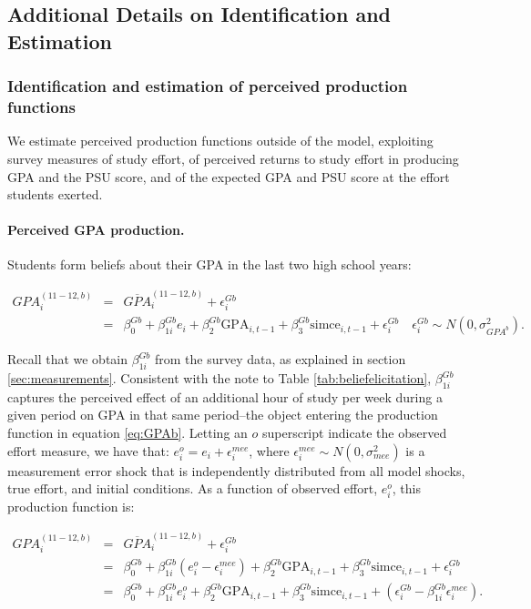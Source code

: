 \subsection{Additional Details on Identification and Estimation}\label{sec:momident}

\subsubsection{Identification and estimation of perceived production functions}\label{sec:PSUbGPAb}

We estimate perceived production functions outside of the model, exploiting survey measures of study effort, of perceived returns to study effort in producing GPA and the PSU score, and of the expected GPA and PSU score at the effort students exerted.\par 



\paragraph{Perceived GPA production.} Students form beliefs about their GPA in the last two high school years:

\begin{eqnarray}
\label{eq:GPAb}
GPA^{(11-12,b)}_{i}&=&\overline{GPA}^{(11-12,b)}_{i}+\epsilon_{i}^{Gb}\\ \nonumber   &=& \beta^{Gb}_{0}+\beta^{Gb}_{1i}e_i+\beta^{Gb}_{2}\mbox{GPA}_{i,t-1}+\beta^{Gb}_{3} \mbox{simce}_{i,t-1}+\epsilon_{i}^{Gb} \quad \epsilon_{i}^{Gb} \sim N(0,\sigma^2_{GPA^b}).
\end{eqnarray} 

\noindent Recall that we obtain $\beta^{Gb}_{1i}$ from the survey data, as explained in section \ref{sec:measurements}. Consistent with the note to Table \ref{tab:beliefelicitation}, $\beta^{Gb}_{1i}$ captures the perceived effect of an additional hour of study per week during a given period on GPA in that same period--the object entering the production function in equation \ref{eq:GPAb}. Letting an $o$ superscript indicate the observed effort measure, we have that: $e_i^o=e_i+\epsilon_i^{mee}$, where $\epsilon_i^{mee}\sim N(0,\sigma^2_{mee})$ is a measurement error shock that is independently distributed from all model shocks, true effort, and initial conditions. As a function of observed effort, $e_i^o$, this production function is:

\begin{eqnarray*}
GPA^{(11-12,b)}_{i}&=&\overline{GPA}^{(11-12,b)}_{i}+\epsilon_{i}^{Gb}\\ \nonumber  
&=& \beta^{Gb}_{0}+\beta^{Gb}_{1i}(e^o_i-\epsilon_i^{mee})+\beta^{Gb}_{2}\mbox{GPA}_{i,t-1}+\beta^{Gb}_{3} \mbox{simce}_{i,t-1}+\epsilon_{i}^{Gb}  \\ \nonumber 
&=& \beta^{Gb}_{0}+\beta^{Gb}_{1i}e^o_i+\beta^{Gb}_{2}\mbox{GPA}_{i,t-1}+\beta^{Gb}_{3} \mbox{simce}_{i,t-1}+(\epsilon_{i}^{Gb}-\beta^{Gb}_{1i}\epsilon_i^{mee}).
\end{eqnarray*} 

